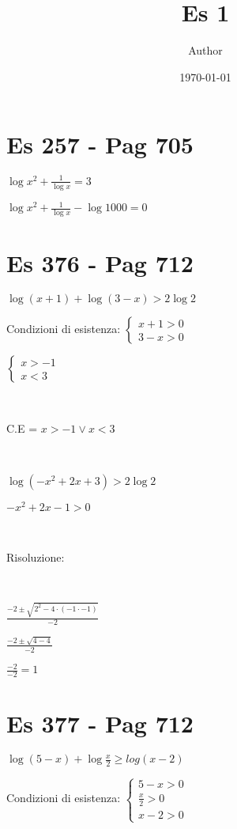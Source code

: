 \documentclass[11pt]{article}
\title{ Es 1}
\author{ Author }
\date{\today}
\begin{document}
\maketitle	

\section{Es 257 - Pag 705}

$\log{x^2} + \frac{1}{\log{x}} = 3$

$\log{x^2} + \frac{1}{\log{x}} - \log{1000} = 0$

\section{Es 376 - Pag 712}

$\log{(x + 1)} + \log{(3 - x)} > 2\log{2}$

Condizioni di esistenza:
$ 
\left \{ \begin{array}{rl}
    x + 1 > 0 \\
    3 - x > 0
    \end{array}
    \right.
$

$ 
\left \{ \begin{array}{rl}
    x > -1 \\
    x < 3
    \end{array}
    \right.
$

\,

C.E = $ x > -1 \vee x < 3 $

\,

$\log{(-x^2 + 2x + 3)} > 2\log{2} $

$ -x^2 + 2x - 1 > 0 $

\,

Risoluzione:

\,

$\frac{-2 \pm \sqrt{2^2 - 4 \cdot (-1 \cdot -1)}}{-2} $

$\frac{-2 \pm \sqrt{4 - 4}}{-2} $

$\frac{-2 }{-2} = 1$



\section{ Es 377 - Pag 712 }

$\log{( 5 - x )} + \log{\frac{x}{2}} \geq log{(x - 2)}$

Condizioni di esistenza:
$ 
\left \{ \begin{array}{rl}
    5 - x > 0 \\
    \frac{x}{2} > 0 \\
    x - 2 > 0
    \end{array}
    \right.
$
\end{document}
